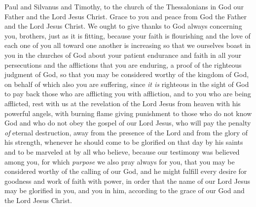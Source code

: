 
\begin{biblechapter} %
 Paul and Silvanus and Timothy, to the church of the Thessalonians in God our Father and the Lord Jesus Christ.
\verse Grace to you and peace from God the Father and the Lord Jesus Christ.
 We ought to give thanks to God always concerning you, brothers, just as it is fitting, because your faith is flourishing and the love of each one of you all toward one another is increasing
\verse so that we ourselves boast in you in the churches of God about your patient endurance and faith in all your persecutions and the afflictions that you are enduring,
\verse a proof of the righteous judgment of God, so that you may be considered worthy of the kingdom of God, on behalf of which also you are suffering,
\verse since \textit{it is} righteous in the sight of God to pay back those who are afflicting you with affliction,
\verse and to you who are being afflicted, rest with us at the revelation of the Lord Jesus from heaven with his powerful angels,
\verse with burning flame giving punishment to those who do not know God and who do not obey the gospel of our Lord Jesus,
\verse who will pay the penalty \textit{of} eternal destruction, away from the presence of the Lord and from the glory of his strength,
\verse whenever he should come to be glorified on that day by his saints and to be marveled at by all who believe, because our testimony was believed among you,
\verse for which \textit{purpose} we also pray always for you, that you may be considered worthy of the calling of our God, and he might fulfill every desire for goodness and work of faith with power,
\verse in order that the name of our Lord Jesus may be glorified in you, and you in him, according to the grace of our God and the Lord Jesus Christ.
\end{biblechapter}


